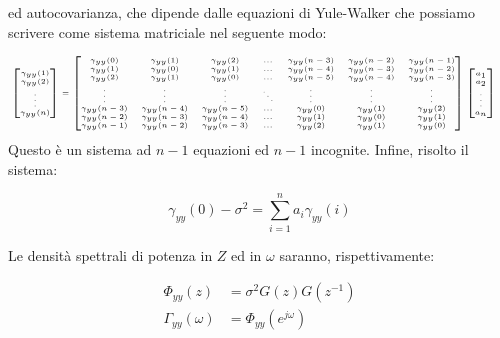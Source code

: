 \noindent ed autocovarianza, che dipende dalle equazioni di Yule-Walker che possiamo scrivere come sistema matriciale nel seguente modo:

  \[ \tiny
    \begin{split}
     &\begin{bmatrix}
        \gamma_{yy}(1) \\ \gamma_{yy}(2) \\ \vdots \\ \gamma_{yy}(n)
      \end{bmatrix}
      =
      \begin{bmatrix}
        \gamma_{yy}(0) & \gamma_{yy}(1) & \gamma_{yy}(2) & ... & \gamma_{yy}(n-3) & \gamma_{yy}(n-2) & \gamma_{yy}(n-1) \\
        \gamma_{yy}(1) & \gamma_{yy}(0) & \gamma_{yy}(1) & ... & \gamma_{yy}(n-4) & \gamma_{yy}(n-3) & \gamma_{yy}(n-2) \\
        \gamma_{yy}(2) & \gamma_{yy}(1) & \gamma_{yy}(0) & ... & \gamma_{yy}(n-5) & \gamma_{yy}(n-4) & \gamma_{yy}(n-3) \\
        \vdots         &  \vdots        & \vdots         & \ddots & \vdots        & \vdots           & \vdots \\
        \gamma_{yy}(n-3) & \gamma_{yy}(n-4) & \gamma_{yy}(n-5) & ... & \gamma_{yy}(0) & \gamma_{yy}(1) & \gamma_{yy}(2) \\
        \gamma_{yy}(n-2) & \gamma_{yy}(n-3) & \gamma_{yy}(n-4) & ... & \gamma_{yy}(1) & \gamma_{yy}(0) & \gamma_{yy}(1) \\
        \gamma_{yy}(n-1) & \gamma_{yy}(n-2) & \gamma_{yy}(n-3) & ... & \gamma_{yy}(2) & \gamma_{yy}(1) & \gamma_{yy}(0) \\
      \end{bmatrix}
      \begin{bmatrix}
        a_1 \\ a_2 \\ \vdots \\ a_n
      \end{bmatrix}
    \end{split}
   \]
\noindent Questo è un sistema ad $n-1$ equazioni ed $n-1$ incognite. Infine, risolto il sistema:

    \[\gamma_{yy}(0)-\sigma^2=\sum_{i=1}^{n}{a_i\gamma_{yy}(i)}  \]

\noindent Le densità spettrali di potenza in $Z$ ed in $\omega$ saranno, rispettivamente:

  \begin{align*}
    \Phi_{yy}(z)&=\sigma^2G(z)G(z^{-1})\\
    \Gamma_{yy}(\omega)&=\Phi_{yy}(e^{j\omega})
  \end{align*}


